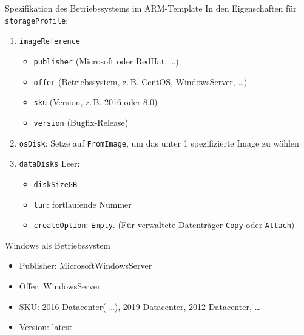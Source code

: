 \begin{flashcard}[Definition]{Spezifikation des Betriebssystems im ARM-Template}
    In den Eigenschaften für \texttt{storageProfile}:
    \begin{enumerate}
        \item \texttt{imageReference}
            \begin{itemize}
                \item \texttt{publisher} (Microsoft oder RedHat, \ldots)
                \item \texttt{offer} (Betriebssystem, z.\,B. CentOS, WindowsServer, \ldots)
                \item \texttt{sku} (Version, z.\,B. 2016 oder 8.0)
                \item \texttt{version} (Bugfix-Release)
            \end{itemize}
        \item \texttt{osDisk}:\newline
            Setze auf \texttt{FromImage}, um das unter 1 spezifizierte Image zu wählen
        \item \texttt{dataDisks}\newline
            Leer:
            \begin{itemize}
             \item \texttt{diskSizeGB}
             \item \texttt{lun}: fortlaufende Nummer
             \item \texttt{createOption}: \texttt{Empty}. (Für verwaltete Datenträger \texttt{Copy} oder \texttt{Attach})
            \end{itemize}
    \end{enumerate}
\end{flashcard}

\begin{flashcard}[Definition]{Windows als Betriebssystem}
    \begin{itemize}
        \item Publisher: MicrosoftWindowsServer
        \item Offer: WindowsServer
        \item SKU: 2016-Datacenter(-\ldots), 2019-Datacenter, 2012-Datacenter, \ldots
        \item Version: latest
    \end{itemize}
\end{flashcard}

